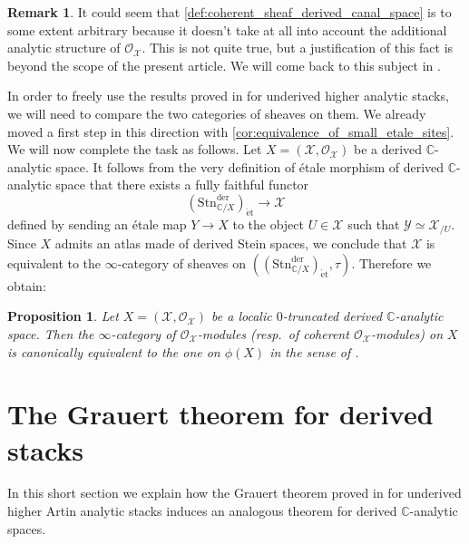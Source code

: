 \documentclass[12pt,a4paper,reqno]{amsart}
\theoremstyle{plain}
\newtheorem{prop}[thm]{Proposition}
\theoremstyle{definition}
\newtheorem{rem}[thm]{Remark}
\theoremstyle{remark}
\numberwithin{equation}{section}
\begin{document}
\begin{rem}
	It could seem that \cref{def:coherent_sheaf_derived_canal_space} is to some extent arbitrary because it doesn't take at all into account the additional analytic structure of ${\mathcal O}_{\mathcal X}$. This is not quite true, but a justification of this fact is beyond the scope of the present article. We will come back to this subject in \cite{Porta_Analytic_deformation_2015}.
\end{rem}

In order to freely use the results proved in \cite{Porta_Yu_Higher_analytic_stacks_2014} for underived higher analytic stacks, we will need to compare the two categories of sheaves on them. We already moved a first step in this direction with \cref{cor:equivalence_of_small_etale_sites}.
We will now complete the task as follows.
Let $X = ({\mathcal X}, {\mathcal O}_{\mathcal X})$ be a derived {$\mathbb C$-analytic\xspace} space.
It follows from the very definition of \'etale morphism of derived {$\mathbb C$-analytic\xspace} space that there exists a fully faithful functor
\[ (\mathrm{Stn}^{\mathrm{der}}_{\mathbb C / X})_{\mathrm{\acute{e}t}} \to {\mathcal X} \]
defined by sending an \'etale map $Y \to X$ to the object $U \in {\mathcal X}$ such that ${\mathcal Y} \simeq {\mathcal X}_{/U}$.
Since $X$ admits an atlas made of derived Stein spaces, we conclude that ${\mathcal X}$ is equivalent to the $\infty$-category of sheaves on $((\mathrm{Stn}^{\mathrm{der}}_{\mathbb C / X})_{\mathrm{\acute{e}t}}, \tau)$.
Therefore we obtain:

\begin{prop} \label{prop:comparison_coherent_sheaves}
	Let $X = ({\mathcal X}, {\mathcal O}_{\mathcal X})$ be a localic $0$-truncated derived {$\mathbb C$-analytic\xspace} space.
	Then the $\infty$-category of ${\mathcal O}_{\mathcal X}$-modules (resp.\ of coherent ${\mathcal O}_{\mathcal X}$-modules) on $X$ is canonically equivalent to the one on $\phi(X)$ in the sense of \cite[Â§5.1]{Porta_Yu_Higher_analytic_stacks_2014}.
\end{prop}

\section{The Grauert theorem for derived stacks} \label{sec:Grauert_theorem}

In this short section we explain how the Grauert theorem proved in \cite{Porta_Yu_Higher_analytic_stacks_2014} for underived higher Artin analytic stacks induces an analogous theorem for derived {$\mathbb C$-analytic\xspace} spaces.
\end{document}
